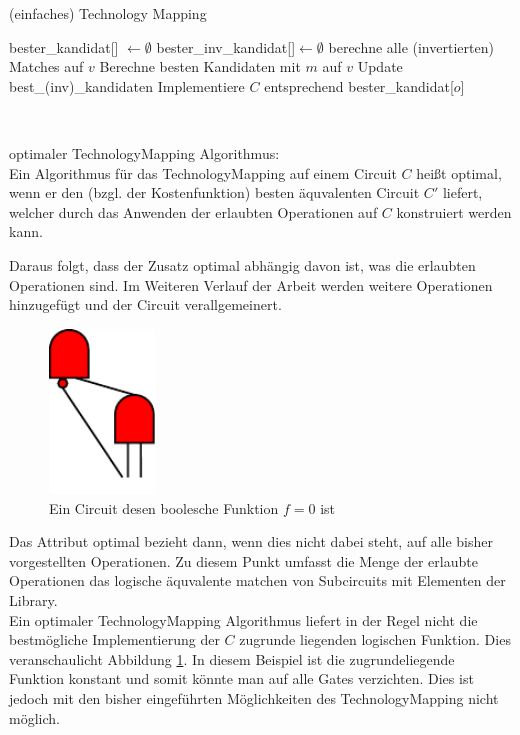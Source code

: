 \documentclass[11pt, a4paper, german]{article}
\newcommand{\TM}{TechnologyMapping }
\begin{document}
\begin{algorithm}[H]
 \LinesNumbered
 \DontPrintSemicolon
 \caption{(einfaches) Technology Mapping}

 bester\_kandidat[] $\gets \emptyset$\;
 bester\_inv\_kandidat[]$ \gets \emptyset$\;
 {
   berechne alle (invertierten) Matches auf $v$\;
   {
      Berechne besten Kandidaten mit $m$ auf $v$\;
      Update best\_(inv)\_kandidaten\;
   }
 }
 Implementiere $C$ entsprechend bester\_kandidat[$o$]\;
\end{algorithm}\ \\

\begin{definition}{optimaler \TM Algorithmus:}\\
	Ein Algorithmus für das \TM auf einem Circuit $C$ heißt optimal, wenn er den (bzgl. der Kostenfunktion) besten äquvalenten Circuit $C'$ liefert, welcher durch das Anwenden der erlaubten Operationen auf $C$ konstruiert werden kann. 
\end{definition}
Daraus folgt, dass der Zusatz optimal abhängig davon ist, was die erlaubten Operationen sind.
Im Weiteren Verlauf der Arbeit werden weitere Operationen hinzugefügt und der Circuit verallgemeinert. 
\begin{figure}
		\includegraphics[width = 2.8cm]{pictures/compiled/compl_redundant}
		\caption{Ein Circuit desen boolesche Funktion $f = 0 $ ist}
		\label{bild:compl_redundant}
\end{figure}
Das Attribut optimal bezieht dann, wenn dies nicht dabei steht,  auf alle bisher vorgestellten Operationen. Zu diesem Punkt umfasst die Menge der erlaubte Operationen das logische äquvalente matchen von Subcircuits mit Elementen der Library.\\

Ein optimaler \TM Algorithmus liefert in der Regel nicht die bestmögliche Implementierung der $C$ zugrunde liegenden logischen Funktion. Dies veranschaulicht Abbildung \ref{bild:compl_redundant}. In diesem Beispiel ist die zugrundeliegende Funktion konstant und somit könnte man auf alle Gates verzichten. Dies ist jedoch mit den bisher eingeführten Möglichkeiten des \TM nicht möglich. \\
\end{document}
